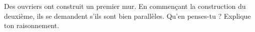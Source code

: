 %
%
    Des ouvriers ont construit un premier mur. En commençant la construction du deuxième, ils se demandent s'ils sont bien parallèles. Qu'en penses-tu ? Explique ton raisonnement.
    \begin{center}
        
    \end{center}

